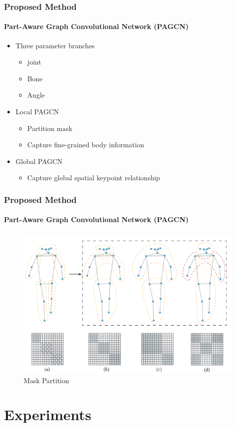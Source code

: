 \documentclass[
	12pt, %
	aspectratio=169, %
]{beamer}
\begin{document}
\begin{frame}
	\frametitle{Proposed Method}
	\framesubtitle{Part-Aware Graph Convolutional Network (PAGCN)}
	
	\begin{itemize}
		\item Three parameter branches
		\begin{itemize}
			\item joint
			\item Bone
			\item Angle
		\end{itemize}
		\item Local PAGCN
		\begin{itemize}
			\item Partition mask
			\item Capture fine-grained body information
		\end{itemize}
		\item Global PAGCN
		\begin{itemize}
			\item Capture global spatial keypoint relationship
		\end{itemize}
	\end{itemize}

\end{frame}

\begin{frame}
	\frametitle{Proposed Method}
	\framesubtitle{Part-Aware Graph Convolutional Network (PAGCN)}
	
	\begin{figure}
		\centering
		\includegraphics[width=0.55\linewidth]{"./Images/mask_partition.png"}
		\caption{Mask Partition}
	\end{figure}
\end{frame}


\section{Experiments}
\end{document}
